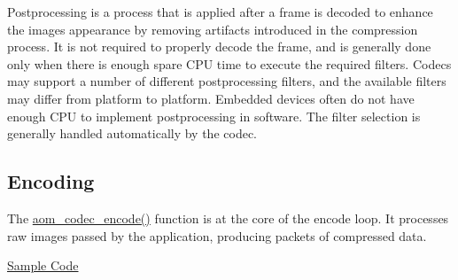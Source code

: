 Postprocessing is a process that is applied after a frame is decoded to enhance the image\textquotesingle{}s appearance by removing artifacts introduced in the compression process. It is not required to properly decode the frame, and is generally done only when there is enough spare C\+PU time to execute the required filters. Codecs may support a number of different postprocessing filters, and the available filters may differ from platform to platform. Embedded devices often do not have enough C\+PU to implement postprocessing in software. The filter selection is generally handled automatically by the codec. \hypertarget{usage_encode}{}\subsection{Encoding}\label{usage_encode}
The \hyperlink{group__encoder_ga6f4a777de5389771e783df7ff1f116d4}{aom\+\_\+codec\+\_\+encode()} function is at the core of the encode loop. It processes raw images passed by the application, producing packets of compressed data.

\hyperlink{samples}{Sample Code} 